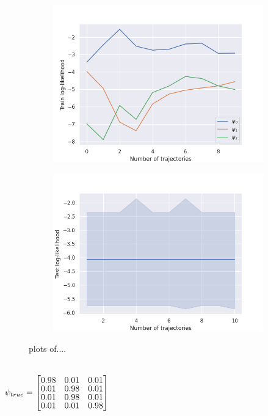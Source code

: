 \begin{figure}[htb]
	\begin{subfigure}{.5\textwidth}
		\centering
		\includegraphics[width=1\linewidth]{figures/llh_[1.0, 0.0, 0.0]}
		\caption{}
		\label{fig:sfig1}
	\end{subfigure}%
	\begin{subfigure}{.5\textwidth}
		\centering
		\includegraphics[width=1\linewidth]{figures/test_likelihood_particleFilter_[1.0, 0.0, 0.0]}
		\caption{}
		\label{fig:sfig2}
	\end{subfigure}
	\caption{plots of....}
	\label{fig:fig}
\end{figure}\\
$\psi_{true} =
\begin{bmatrix} \vspace{-2pt}
0.98 & 0.01 & 0.01 \\  \vspace{-2pt}
0.01 & 0.98 & 0.01 \\  \vspace{-2pt}
0.01 & 0.98 & 0.01 \\  \vspace{-1pt}
0.01 & 0.01 & 0.98
\end{bmatrix}$
